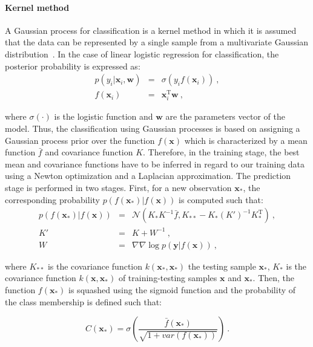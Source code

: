 \paragraph{Kernel method}
A Gaussian process for classification is a kernel method in which it is assumed that the data can be represented by a single sample from a multivariate Gaussian distribution~\cite{Rasmussen2005}.
In the case of linear logistic regression for classification, the posterior probability is expressed as:
\begin{eqnarray}
	p(y_i|\mathbf{x}_i,\mathbf{w}) & = & \sigma(y_i f(\mathbf{x}_i)) \ , \label{eq:gp1} \\
	f(\mathbf{x}_i) & = & \mathbf{x}_i^{\text{T}} \mathbf{w} \ , \nonumber
\end{eqnarray}

\noindent where $\sigma(\cdot)$ is the logistic function and $\mathbf{w}$ are the parameters vector of the model.
Thus, the classification using Gaussian processes is based on assigning a Gaussian process prior over the function $f(\mathbf{x})$ which is characterized by a mean function $\bar{f}$ and covariance function $K$.
Therefore, in the training stage, the best mean and covariance functions have to be inferred in regard to our training data using a Newton optimization and a Laplacian approximation.
The prediction stage is performed in two stages.
First, for a new observation $\mathbf{x}_*$, the corresponding probability $p(f(\mathbf{x}_*)|f(\mathbf{x}))$ is computed such that:
\begin{eqnarray}
	p(f(\mathbf{x}_*)|f(\mathbf{x})) & = & \mathcal{N}( K_*K^{-1}\bar{f}, K_{**}-K_*(K')^{-1}K_*^{\text{T}} ) \ , \nonumber \\
	K' & = & K + W^{-1} \ , \label{eq:gp2} \\
	W & = & \nabla \nabla \log p(\mathbf{y}|f(\mathbf{x})) \ , \nonumber
\end{eqnarray}

\noindent where $K_{**}$ is the covariance function $k(\mathbf{x}_*, \mathbf{x}_*)$ the testing sample $\mathbf{x}_*$, $K_{*}$ is the covariance function $k(\mathbf{x}, \mathbf{x}_*)$ of training-testing samples $\mathbf{x}$ and $\mathbf{x}_*$.
Then, the function $f(\mathbf{x}_*)$ is squashed using the sigmoid function and the probability of the class membership is defined such that:

\begin{equation}
	C(\mathbf{x}_*) = \sigma\left( \frac{\bar{f}(\mathbf{x_*})}{\sqrt{1+var(f(\mathbf{x}_*))}} \right) \ .
	\label{eq:gp3}
\end{equation}

